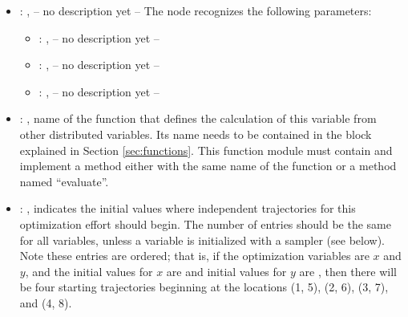 \begin{itemize}
\begin{itemize}
        \item {}: ,
          -- no description yet --
          The  node recognizes the following parameters:
            \begin{itemize}
              \item {}: ,
                -- no description yet --
              \item {}: ,
                -- no description yet --
              \item {}: ,
                -- no description yet --
          \end{itemize}

        \item {}: ,
          name of the function that               defines the calculation of this variable from
          other distributed variables.  Its name               needs to be contained in the
           block explained in Section               \ref{sec:functions}. This
          function module must contain and implement a method either with the same name of the
          function or a method named  ``evaluate''.               

        \item {}: ,
          indicates the initial values where independent trajectories for this optimization
          effort should begin. The number of entries should be the same for all variables, unless
          a variable is initialized with a sampler (see  below). Note these
          entries are ordered; that is, if the optimization variables are $x$ and $y$, and the
          initial               values for $x$ are  and initial values for $y$
          are ,               then there will be four starting trajectories
          beginning at the locations (1, 5), (2, 6),               (3, 7), and (4, 8).
      \end{itemize}


\end{itemize}

